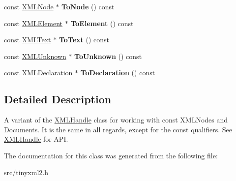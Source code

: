 \begin{DoxyCompactItemize}
\item 
\mbox{\label{classCPlantBox_1_1tinyxml2_1_1XMLConstHandle_ad04d4a8bde964003d2c6530b8ea027e2}} 
const \hyperlink{classCPlantBox_1_1tinyxml2_1_1XMLNode}{X\+M\+L\+Node} $\ast$ {\bfseries To\+Node} () const
\item 
\mbox{\label{classCPlantBox_1_1tinyxml2_1_1XMLConstHandle_a4ca3f09ea0b0c764b77bd9395a3dc2b1}} 
const \hyperlink{classCPlantBox_1_1tinyxml2_1_1XMLElement}{X\+M\+L\+Element} $\ast$ {\bfseries To\+Element} () const
\item 
\mbox{\label{classCPlantBox_1_1tinyxml2_1_1XMLConstHandle_a599df87345899a14c09614ccba452c6e}} 
const \hyperlink{classCPlantBox_1_1tinyxml2_1_1XMLText}{X\+M\+L\+Text} $\ast$ {\bfseries To\+Text} () const
\item 
\mbox{\label{classCPlantBox_1_1tinyxml2_1_1XMLConstHandle_ad2dc1247dcfdc5988e683efc3da56815}} 
const \hyperlink{classCPlantBox_1_1tinyxml2_1_1XMLUnknown}{X\+M\+L\+Unknown} $\ast$ {\bfseries To\+Unknown} () const
\item 
\mbox{\label{classCPlantBox_1_1tinyxml2_1_1XMLConstHandle_a29c95bd798c49368b01f0901e7945cad}} 
const \hyperlink{classCPlantBox_1_1tinyxml2_1_1XMLDeclaration}{X\+M\+L\+Declaration} $\ast$ {\bfseries To\+Declaration} () const
\end{DoxyCompactItemize}


\subsection{Detailed Description}
A variant of the \hyperlink{classCPlantBox_1_1tinyxml2_1_1XMLHandle}{X\+M\+L\+Handle} class for working with const X\+M\+L\+Nodes and Documents. It is the same in all regards, except for the \textquotesingle{}const\textquotesingle{} qualifiers. See \hyperlink{classCPlantBox_1_1tinyxml2_1_1XMLHandle}{X\+M\+L\+Handle} for A\+PI. 

The documentation for this class was generated from the following file\+:\begin{DoxyCompactItemize}
\item 
src/tinyxml2.\+h\end{DoxyCompactItemize}
